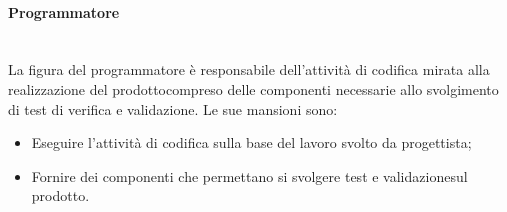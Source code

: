 			\paragraph{Programmatore}\mbox{}\\ [1mm]
				La figura del programmatore è responsabile dell'attività di codifica mirata alla realizzazione del prodotto\glosp compreso delle componenti necessarie allo svolgimento di test di verifica e validazione.
				Le sue mansioni sono:
				\begin{itemize}
					\item Eseguire l'attività di codifica sulla base del lavoro svolto da progettista;
					\item Fornire dei componenti che permettano si svolgere test e validazione\glosp sul prodotto\glo.
				\end{itemize}
